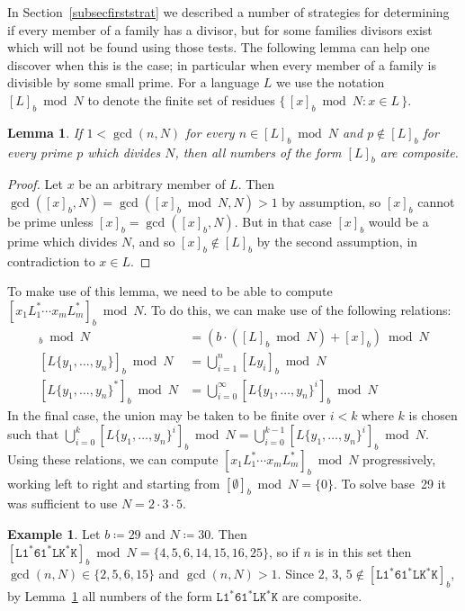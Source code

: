 \documentclass[12pt]{article}
\theoremstyle{plain}
\newtheorem{lemma}[theorem]{Lemma}
\theoremstyle{definition}
\newtheorem{example}[theorem]{Example}
\newcommand{\0}{\mathtt{0}}
\newcommand{\1}{\mathtt{1}}
\newcommand{\2}{\mathtt{2}}
\newcommand{\3}{\mathtt{3}}
\newcommand{\4}{\mathtt{4}}
\newcommand{\5}{\mathtt{5}}
\newcommand{\6}{\mathtt{6}}
\newcommand{\7}{\mathtt{7}}
\newcommand{\8}{\mathtt{8}}
\newcommand{\9}{\mathtt{9}}
\newcommand{\set}[2]{\{\,#1{}:{}#2\,\}}
\begin{document}
In Section~\ref{subsecfirststrat} we described a number of strategies for determining if every member of a family has a divisor,
but for some families divisors exist which will not be found using those tests.  The following lemma can help one discover when
this is the case; in particular when every member of a family is divisible by some small prime.  For a language $L$ we use the
notation $[L]_b\bmod N$ to denote the finite set of residues $\set{[x]_b\bmod N}{x\in L}$.
\begin{lemma}\label{lemextdiv}
If\/ $1<\gcd(n,N)$ for every $n\in[L]_b\bmod N$ and $p\notin[L]_b$ for every prime $p$ which divides $N$, then all numbers of the form $[L]_b$ are composite.
\end{lemma}
\begin{proof}
Let $x$ be an arbitrary member of $L$.  Then $\gcd([x]_b,N)=\gcd([x]_b\bmod N,N)>1$ by assumption, so $[x]_b$ cannot be prime unless $[x]_b=\gcd([x]_b,N)$.  But in that case $[x]_b$ would be a prime which divides $N$, and so $[x]_b\notin[L]_b$ by the second assumption, in contradiction to $x\in L$.
\end{proof}
To make use of this lemma, we need to be able to compute $[x_1L_1^*\dotsm x_mL_m^*]_b\bmod N$.  To do this, we can make use of the following relations:
\begin{align*}
[Lx]_b \bmod N &= (b\cdot([L]_b\bmod N)+[x]_b)\bmod N \\
[L\{y_1,\dotsc,y_n\}]_b \bmod N &= \bigcup_{i=1}^n[Ly_i]_b\bmod N \\
[L\{y_1,\dotsc,y_n\}^*]_b \bmod N &= \bigcup_{i=0}^\infty[L\{y_1,\dotsc,y_n\}^i]_b\bmod N
\end{align*}
In the final case, the union may be taken to be finite over $i<k$ where $k$ is chosen such that $\bigcup_{i=0}^k[L\{y_1,\dotsc,y_n\}^i]_b\bmod N=\bigcup_{i=0}^{k-1}[L\{y_1,\dotsc,y_n\}^i]_b\bmod N$.
Using these relations, we can compute $[x_1L_1^*\dotsm x_mL_m^*]_b\bmod N$ progressively, working left to right and starting from $[\emptyset]_b\bmod N = \{0\}$.  To solve base~29 it was sufficient to use $N=2\cdot3\cdot5$.
\begin{example}
Let $b\coloneqq29$ and $N\coloneqq30$. %
Then $[\mathtt{L}\1^*\6\1^*\mathtt{LK}^*\mathtt{K}]_b\bmod N=\{4,5,6,14,15,16,25\}$, so if $n$ is in this set then $\gcd(n,N)\in\{2,5,6,15\}$ and $\gcd(n,N)>1$.  Since $2$, $3$, $5\notin[\mathtt{L}\1^*\6\1^*\mathtt{LK}^*\mathtt{K}]_b$, by Lemma~\ref{lemextdiv} all numbers of the form $\mathtt{L}\1^*\6\1^*\mathtt{LK}^*\mathtt{K}$ are composite.
\end{example}
\end{document}

